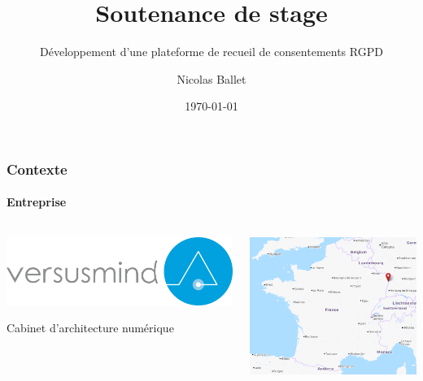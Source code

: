 \documentclass[aspectratio=169]{beamer}
\title[Développement d’une plateforme de recueil de consentements RGPD]{Soutenance de stage}
\subtitle{Développement d’une plateforme de recueil de consentements RGPD}
\author{Nicolas Ballet}
\institute[UTBM]{Université de Technologie de Belfort Montbéliard}
\date[\the\year-\twodigits\month-\twodigits\day]{\today}
\begin{document}
	\begin{frame}
		\titlepage
	\end{frame}
	\begin{frame}
		\frametitle{Contexte}
		\framesubtitle{Entreprise}
        \begin{columns}
            \hfill
            \begin{column}{0.45\textwidth}
                \begin{center}
                    \hfill\includegraphics[width=1.0\textwidth]{versusmind.png}
                \end{center}
                \hfill \color{gray} Cabinet d'architecture numérique   
            \end{column}
            \begin{column}{0.5\textwidth}
                \begin{center}
                    \includegraphics[width=1.0\textwidth]{strasbourg.png}
                \end{center}
            \end{column}
        \end{columns}
	\end{frame}
\end{document}

